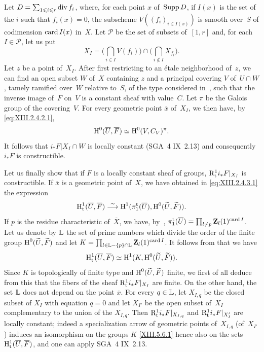 Let $D=\sum_{1\leqslant i\leqslant r}\operatorname{\mathrm{div}} f_i$, where, for each point
$x$ of~$\operatorname{Supp} D$, if $I(x)$ is the set of the $i$ such that
$f_i(x)=0$, the subscheme $V((f_i)_{i\in I(x)})$ is smooth over~$S$ of codimension $\operatorname{card} I(x)$ in~$X$. Let $\mathcal{P}$ be
the set of subsets of~$[ 1,r ]$ and, for each $I\in\mathcal{P}$,
let us put
$$
X_I=\textstyle\Big(\bigcap_{i\in I}V(f_i)\Big)\cap\Big(\bigcap_{i\not\in I}X_{f_i}\Big).
$$
Let
$z$ be a point of~$X_I$. After first restricting to an
\'etale neighborhood of~$z$, we can find an open subset $W$ of~$X$
containing $z$ and a principal covering $V$ of~$U\cap W$,
tamely ramified over~$W$ relative to~$S$, of the type
considered in~, such that the inverse
image of~$F$ on~$V$ is a constant sheaf with
value~$C$. Let $\pi$ be the Galois group of the covering~$V$. For
every geometric point $\overline{x}$ of~$X_I$, we then have,
by \eqref{eq:XIII.2.4.2.1},
$$
\operatorname{H}^0(\overline{U},\overline{F})\simeq \operatorname{H}^0(V,C_V)^{\pi}.
$$
It follows that $i_*F|X_I\cap W$ is locally constant (SGA~4
IX~2.13) and consequently $i_*F$ is constructible.

Let us finally show that if $F$ is a locally constant sheaf of groups,
$\mathrm{R}^1_{\mathrm{t}}i_*F|_{X_I}$ is constructible. If
$\overline{x}$ is a geometric point of~$X$, we have obtained
in \eqref{eq:XIII.2.4.3.1} the expression
$$
\operatorname{H}^1_{\mathrm{t}}(\overline{U},\overline{F})\overset{\sim}{\longrightarrow}
\operatorname{H}^1(\pi^{\mathrm{t}}_1(\overline{U}),\operatorname{H}^0(\widetilde{U},\widetilde{F})).
$$
If $p$ is the residue characteristic of~$\overline{X}$, we
have, by~,
$\pi_1^{\mathrm{t}}(\overline{U})=\prod_{l\neq p }\mathbf{Z}_l(1)^{\operatorname{card} I}$. Let us denote by $\mathbb{L}$ the set of prime numbers which
divide the order of the finite group $\operatorname{H}^0(\widetilde{U},\widetilde{F})$ and
let $K=\prod_{l\in\mathbb{L} -\{p\}\cap\mathbb{L} }\mathbf{Z}_l(1)^{\operatorname{card} I}$. It
follows from \cite[I \S5 ex.2]{XIII.4} that we have
$$
\operatorname{H}^1_{\mathrm{t}}(\overline{U},\overline{F})\simeq
\operatorname{H}^1(K,\operatorname{H}^0(\widetilde{U},\widetilde{F})).
$$
Since $K$ is topologically of finite type and
$\operatorname{H}^0(\widetilde{U},\widetilde{F})$ finite, we first of all
deduce from this that the fibers of the sheaf $\mathrm{R}^1_{\mathrm{t}}i_*F|_{X_I}$ are
finite. On the other hand, the set $\mathbb{L}$ does not depend on the point
$\overline{x}$. For every $q\in\mathbb{L}$, let $X_{I,q}$ be the closed subset of
$X_I$ with equation $q=0$ and let $X_{I'}$ be the open subset of~$X_I$
complementary to the union of the $X_{I,q}$. Then
$\mathrm{R}^1_{\mathrm{t}}i_*F|_{X_{I,q}}$ and $\mathrm{R}^1_{\mathrm{t}}i_*F|_{X_I'}$ are
locally constant; indeed a specialization arrow of
geometric points of~$X_{I,q}$ (\resp of~$X_{I'}$) induces an
isomorphism on the groups $K$ \eqref{XIII.5.6.1} hence also on the
sets $\operatorname{H}^1_{\mathrm{t}}(\overline{U},\overline{F})$, and one can apply
SGA~4 IX~2.13.

